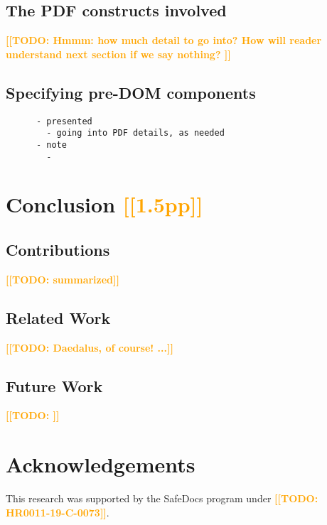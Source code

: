 \documentclass[conference,10pt]{IEEEtran}
\newcommand{\note}[1]{\noteYes{#1}}
\newcommand{\noteYes}[1]{\textbf{\textcolor{orange}{[[#1]]}}}
\newcommand{\todo}[1]{\note{TODO: #1}}
\begin{document}
\subsection{The PDF constructs involved}
      \todo{Hmmm: how much detail to go into?
            How will reader understand next section if we say nothing?
           }
\subsection{Specifying pre-DOM components}
      
      \begin{lstlisting}
      - presented
        - going into PDF details, as needed
      - note
        - 
      \end{lstlisting}

\section{Conclusion \note{1.5pp}}
   \label{sec:conclusion}
\subsection{Contributions}
      \todo{summarized}
      
\subsection{Related Work}
      \todo{Daedalus, of course! ...}
      
\subsection{Future Work}
      \todo{}


\section*{Acknowledgements}

This research was supported by the SafeDocs program under \todo{HR0011-19-C-0073}.




% 
\end{document}
